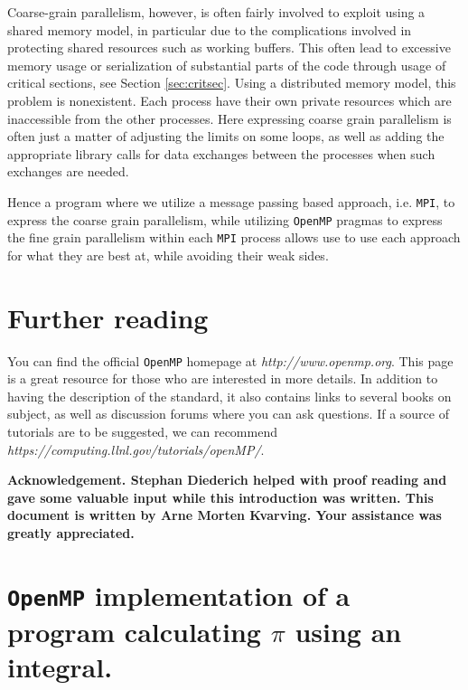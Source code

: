 \documentclass[twoside, 11pt, a4paper]{article}
\begin{document}
Coarse-grain parallelism, however, is often fairly involved to exploit using a shared
memory model, in particular due to the complications involved in protecting shared resources
such as working buffers. This often lead to excessive memory usage or serialization of
substantial parts of the code through usage of critical sections, see Section \ref{sec:critsec}.
Using a distributed memory model, this problem is nonexistent. Each process have 
their own private resources which are inaccessible from the other processes.
Here expressing coarse grain parallelism is often just a matter of adjusting the limits
on some loops, as well as adding the appropriate library calls for data exchanges
between the processes when such exchanges are needed.

Hence a program where we utilize a message passing based approach, i.e. \texttt{MPI}, to
express the coarse grain parallelism, while utilizing \texttt{OpenMP} pragmas to express
the fine grain parallelism within each \texttt{MPI} process allows use to use each
approach for what they are best at, while avoiding their weak sides.

\section{Further reading}
You can find the official \texttt{OpenMP} homepage at \emph{http://www.openmp.org}. This page is a great
resource for those who are interested in more details. In addition to having the description
of the standard, it also contains links to several books on subject, as well as discussion forums
where you can ask questions. If a source of tutorials are to be suggested,
we can recommend \emph{https://computing.llnl.gov/tutorials/openMP/}.

\bf Acknowledgement\rm. Stephan Diederich helped with proof reading
and gave some valuable input while this introduction was written.
This document is written by Arne Morten Kvarving. Your assistance was greatly appreciated.
\nocite{openmp}
\nocite{openmptut}


%
\appendix
\section{\texttt{OpenMP} implementation of a program calculating $\pi$ using an integral.}
\label{app:poissonOpenMP}

\end{document}
